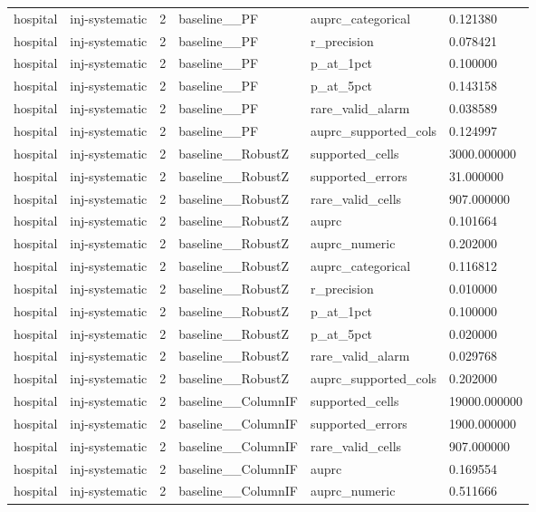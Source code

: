 \begin{tabular}{llllll}
hospital & inj-systematic & 2 & baseline\_\_PF & auprc\_categorical & 0.121380 \\
hospital & inj-systematic & 2 & baseline\_\_PF & r\_precision & 0.078421 \\
hospital & inj-systematic & 2 & baseline\_\_PF & p\_at\_1pct & 0.100000 \\
hospital & inj-systematic & 2 & baseline\_\_PF & p\_at\_5pct & 0.143158 \\
hospital & inj-systematic & 2 & baseline\_\_PF & rare\_valid\_alarm & 0.038589 \\
hospital & inj-systematic & 2 & baseline\_\_PF & auprc\_supported\_cols & 0.124997 \\
hospital & inj-systematic & 2 & baseline\_\_RobustZ & supported\_cells & 3000.000000 \\
hospital & inj-systematic & 2 & baseline\_\_RobustZ & supported\_errors & 31.000000 \\
hospital & inj-systematic & 2 & baseline\_\_RobustZ & rare\_valid\_cells & 907.000000 \\
hospital & inj-systematic & 2 & baseline\_\_RobustZ & auprc & 0.101664 \\
hospital & inj-systematic & 2 & baseline\_\_RobustZ & auprc\_numeric & 0.202000 \\
hospital & inj-systematic & 2 & baseline\_\_RobustZ & auprc\_categorical & 0.116812 \\
hospital & inj-systematic & 2 & baseline\_\_RobustZ & r\_precision & 0.010000 \\
hospital & inj-systematic & 2 & baseline\_\_RobustZ & p\_at\_1pct & 0.100000 \\
hospital & inj-systematic & 2 & baseline\_\_RobustZ & p\_at\_5pct & 0.020000 \\
hospital & inj-systematic & 2 & baseline\_\_RobustZ & rare\_valid\_alarm & 0.029768 \\
hospital & inj-systematic & 2 & baseline\_\_RobustZ & auprc\_supported\_cols & 0.202000 \\
hospital & inj-systematic & 2 & baseline\_\_ColumnIF & supported\_cells & 19000.000000 \\
hospital & inj-systematic & 2 & baseline\_\_ColumnIF & supported\_errors & 1900.000000 \\
hospital & inj-systematic & 2 & baseline\_\_ColumnIF & rare\_valid\_cells & 907.000000 \\
hospital & inj-systematic & 2 & baseline\_\_ColumnIF & auprc & 0.169554 \\
hospital & inj-systematic & 2 & baseline\_\_ColumnIF & auprc\_numeric & 0.511666 \\

\end{tabular}
